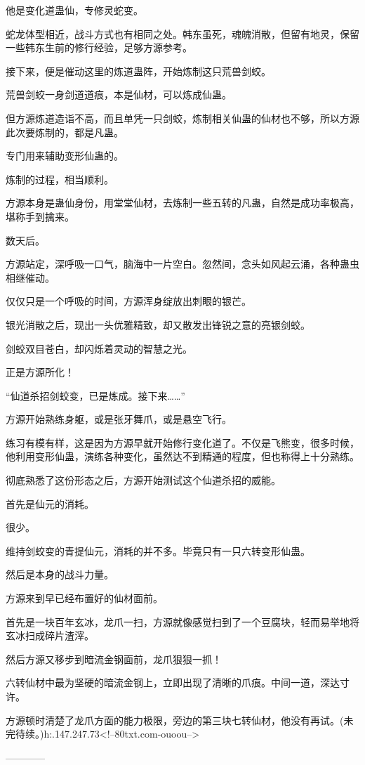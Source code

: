 \begin{this_body}
他是变化道蛊仙，专修灵蛇变。

蛇龙体型相近，战斗方式也有相同之处。韩东虽死，魂魄消散，但留有地灵，保留一些韩东生前的修行经验，足够方源参考。

接下来，便是催动这里的炼道蛊阵，开始炼制这只荒兽剑蛟。

荒兽剑蛟一身剑道道痕，本是仙材，可以炼成仙蛊。

但方源炼道造诣不高，而且单凭一只剑蛟，炼制相关仙蛊的仙材也不够，所以方源此次要炼制的，都是凡蛊。

专门用来辅助变形仙蛊的。

炼制的过程，相当顺利。

方源本身是蛊仙身份，用堂堂仙材，去炼制一些五转的凡蛊，自然是成功率极高，堪称手到擒来。

数天后。

方源站定，深呼吸一口气，脑海中一片空白。忽然间，念头如风起云涌，各种蛊虫相继催动。

仅仅只是一个呼吸的时间，方源浑身绽放出刺眼的银芒。

银光消散之后，现出一头优雅精致，却又散发出锋锐之意的亮银剑蛟。

剑蛟双目苍白，却闪烁着灵动的智慧之光。

正是方源所化！

“仙道杀招剑蛟变，已是炼成。接下来……”

方源开始熟练身躯，或是张牙舞爪，或是悬空飞行。

练习有模有样，这是因为方源早就开始修行变化道了。不仅是飞熊变，很多时候，他利用变形仙蛊，演练各种变化，虽然达不到精通的程度，但也称得上十分熟练。

彻底熟悉了这份形态之后，方源开始测试这个仙道杀招的威能。

首先是仙元的消耗。

很少。

维持剑蛟变的青提仙元，消耗的并不多。毕竟只有一只六转变形仙蛊。

然后是本身的战斗力量。

方源来到早已经布置好的仙材面前。

首先是一块百年玄冰，龙爪一扫，方源就像感觉扫到了一个豆腐块，轻而易举地将玄冰扫成碎片渣滓。

然后方源又移步到暗流金钢面前，龙爪狠狠一抓！

六转仙材中最为坚硬的暗流金钢上，立即出现了清晰的爪痕。中间一道，深达寸许。

方源顿时清楚了龙爪方面的能力极限，旁边的第三块七转仙材，他没有再试。(未完待续。)h:.147.247.73<!--80txt.com-ouoou-->

------------

\end{this_body}

